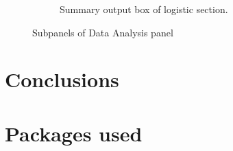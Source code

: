 \documentclass[
12pt, %
a4paper, %
oneside, %
headinclude,footinclude, %
BCOR5mm, %
]{scrartcl}
\begin{document}
\begin{figure}[H]
\begin{subfigure}{0.6\textwidth}
  \caption{Summary output box of logistic section.}
  \label{fig:logistic_smry1}
\end{subfigure}
\label{fig:logistic_plots_set2}
\caption{Subpanels of Data Analysis panel }
\end{figure}

\clearpage

\section{Conclusions}

\section{Packages used}






\renewcommand{\refname}{\spacedlowsmallcaps{References}} %




\end{document}
